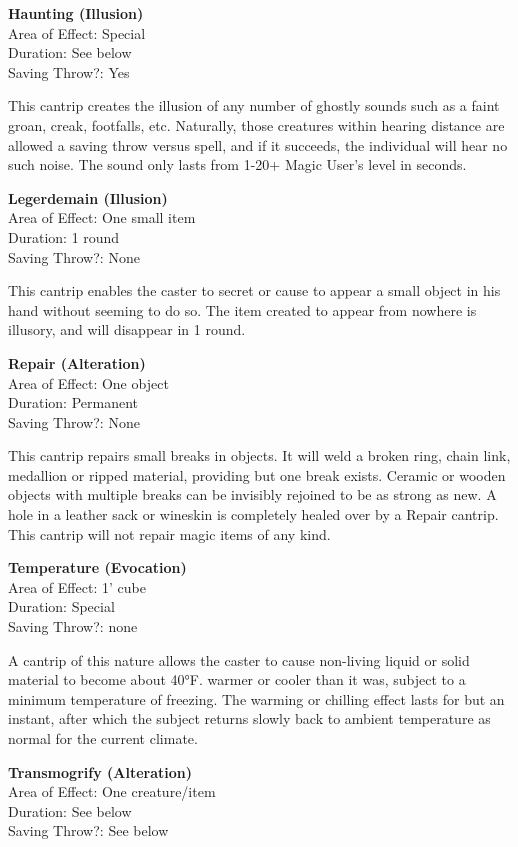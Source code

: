 \documentclass[letterpaper,sansserif,tightsqueeze]{rpg-module}
\begin{document}
\textbf{Haunting (Illusion)}\\
Area of Effect: Special\\
Duration: See below\\
Saving Throw?: Yes

This cantrip creates the illusion of any number of ghostly sounds such as a faint groan, creak, footfalls, etc. Naturally, those creatures within hearing distance are allowed a saving throw versus spell, and if it succeeds, the individual will hear no such noise. The sound only lasts from 1-20+ Magic User’s level in seconds.

\textbf{Legerdemain (Illusion)}\\
Area of Effect: One small item\\
Duration: 1 round\\
Saving Throw?: None
	
This cantrip enables the caster to secret or cause to appear a small object in his hand without seeming to do so. The item created to appear from nowhere is illusory, and will disappear in 1 round.
	
\textbf{Repair (Alteration)}\\
Area of Effect: One object\\
Duration: Permanent\\
Saving Throw?: None
	
This cantrip repairs small breaks in objects. It will weld a broken ring, chain link, medallion or ripped material, providing but one break exists. Ceramic or wooden objects with multiple breaks can be invisibly rejoined to be as strong as new. A hole in a leather sack or wineskin is completely healed over by a Repair cantrip. This cantrip will not repair magic items of any kind.
	
\textbf{Temperature (Evocation)}\\
Area of Effect: 1' cube\\
Duration: Special\\
Saving Throw?: none
	
A cantrip of this nature allows the caster to cause non-living liquid or solid material to become about 40°F. warmer or cooler than it was, subject to a minimum temperature of freezing. The warming or chilling effect lasts for but an instant, after which the subject returns slowly back to ambient temperature as normal for the current climate.
	
\textbf{Transmogrify (Alteration)}\\
Area of Effect: One creature/item\\
Duration: See below\\
Saving Throw?: See below
	
\end{document}
